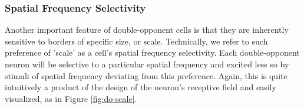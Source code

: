 \documentclass[journal,onecolumn]{IEEEtran}
\begin{document}
\subsubsection*{Spatial Frequency Selectivity}

Another important feature of double-opponent cells is that they are inherently sensitive to borders of specific size, or scale. Technically, we refer to such preference of 'scale' as a cell's spatial frequency selectivity. Each double-opponent neuron will be selective to a particular spatial frequency and excited less so by stimuli of spatial frequency deviating from this preference. Again, this is quite intuitively a product of the design of the neuron's receptive field and easily visualized, as in Figure \ref{fig:do-scale}.

\end{document}
